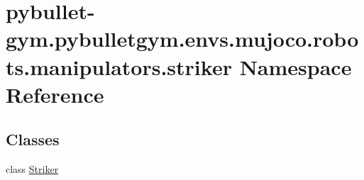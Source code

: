 \hypertarget{namespacepybullet-gym_1_1pybulletgym_1_1envs_1_1mujoco_1_1robots_1_1manipulators_1_1striker}{}\section{pybullet-\/gym.pybulletgym.\+envs.\+mujoco.\+robots.\+manipulators.\+striker Namespace Reference}
\label{namespacepybullet-gym_1_1pybulletgym_1_1envs_1_1mujoco_1_1robots_1_1manipulators_1_1striker}
\subsection*{Classes}
\begin{DoxyCompactItemize}
\item 
class \hyperlink{classpybullet-gym_1_1pybulletgym_1_1envs_1_1mujoco_1_1robots_1_1manipulators_1_1striker_1_1_striker}{Striker}
\end{DoxyCompactItemize}
